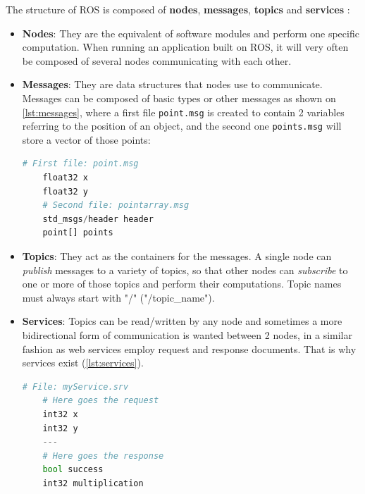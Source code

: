  The structure of ROS is composed of \textbf{nodes}, \textbf{messages}, \textbf{topics} and \textbf{services} :

\begin{itemize}
  \item \textbf{Nodes}: They are the equivalent of software modules and perform one specific computation. When running an application built on ROS, it will very often be composed of several nodes communicating with each other.

  \item \textbf{Messages}: They are data structures that nodes use to communicate. Messages can be composed of basic types or other messages as shown on \autoref{lst:messages}, where a first file \texttt{point.msg} is created to contain 2 variables referring to the position of an object, and the second one \texttt{points.msg} will store a vector of those points:
  \begin{lstlisting}[float=htb,language=Python,frame=htb,caption={Example message files},label=lst:messages] 
    # First file: point.msg
    float32 x
    float32 y 
    # Second file: pointarray.msg
    std_msgs/header header
    point[] points
  \end{lstlisting}

  \item \textbf{Topics}: They act as the containers for the messages. A single node can \textit{publish} messages to a variety of topics, so that other nodes can \textit{subscribe} to one or more of those topics and perform their computations. Topic names must always start with "/" (\ie  "/topic\_name").

  \item \textbf{Services}: Topics can be read/written by any node and sometimes a more bidirectional form of communication is wanted between 2 nodes, in a similar fashion as web services employ request and response documents. That is why services exist (\autoref{lst:services}).
  \begin{lstlisting}[float=htb,language=Python,frame=htb,caption={Example service file},label=lst:services] 
    # File: myService.srv
    # Here goes the request
    int32 x
    int32 y
    ---
    # Here goes the response
    bool success
    int32 multiplication
  \end{lstlisting}
\end{itemize}  

